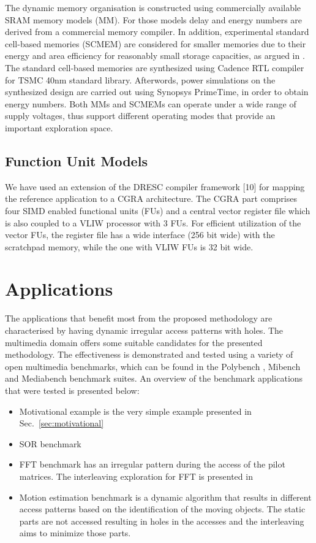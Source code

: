 \documentclass[prodmode,acmtodaes]{acmsmall}
\begin{document}
The dynamic memory organisation is constructed using commercially available SRAM memory models (MM).
For those models delay and energy numbers are derived from a commercial memory compiler.
In addition, experimental standard cell-based memories (SCMEM) \cite{Mei11}  are  considered for smaller memories due to their energy and area efficiency for reasonably small storage capacities, as argued in \cite{Mei10}. 
The standard cell-based memories are synthesized using Cadence RTL compiler for TSMC 40nm standard library. 
Afterwords, power simulations on the synthesized design are carried out using Synopsys PrimeTime, in order to obtain energy numbers.
Both MMs and SCMEMs can operate under a wide range of supply voltages, thus support different operating modes that provide an important exploration space.

\subsection{Function Unit Models}

We have used an extension of the DRESC compiler framework [10] for mapping the reference application to a CGRA architecture.
The CGRA part comprises four SIMD enabled functional units (FUs) and a central vector register file which is also coupled to a VLIW processor with 3 FUs. 
For efficient utilization of the vector FUs, the register file has a wide interface (256 bit wide) with the scratchpad memory, while the one with VLIW FUs is 32 bit wide. 

\section{Applications}

The applications that benefit most from the proposed methodology are characterised by having dynamic irregular access patterns with holes.
The multimedia domain offers some suitable candidates for the presented methodology.
The effectiveness is demonstrated and tested using a variety of open multimedia benchmarks, which can be found in the Polybench \cite{Poly}, Mibench \cite{mibench} and Mediabench \cite{mediabench} benchmark suites.
An overview of the benchmark applications that were tested is presented below:

\begin{itemize}
\item Motivational example is the very simple example presented in Sec.~\ref{sec:motivational}
\item SOR benchmark 
\item FFT benchmark has an irregular pattern during the access of the pilot matrices. The interleaving exploration for FFT is presented in \cite{sharma2013data}
\item Motion estimation benchmark is a dynamic algorithm that results in different access patterns based on the identification of the moving objects. 
The static parts are not accessed resulting in holes in the accesses and the interleaving aims to minimize those parts.
\end{itemize}
\end{document}
